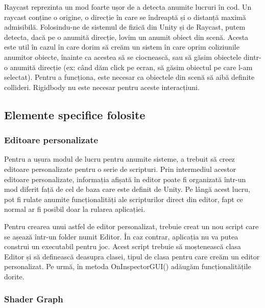 \documentclass[12pt, a4paper]{article}
\begin{document}
	Raycast reprezinta un mod foarte ușor de a detecta anumite lucruri în cod. Un raycast conține o origine, o direcție în care se îndreaptă și o distanță maximă admisibilă. Folosindu-ne de sistemul de fizică din Unity și de Raycast, putem detecta, dacă pe o anumită direcție, lovim un anumit obiect din scenă. Acesta este util în cazul în care dorim să creăm un sistem în care oprim coliziunile anumitor obiecte, înainte ca acestea să se ciocnească, sau să găsim obiectele dintr-o anumită direcție (ex: când dăm click pe ecran, să găsim obiectul pe care l-am selectat). Pentru a funcționa, este necesar ca obiectele din scenă să aibă definite collideri. Rigidbody nu este necesar pentru aceste interacțiuni.
	
	
	
	
	\subsection{Elemente specifice folosite}
	\label{section: specificElements}	
	
	\subsubsection{Editoare personalizate}
	
	Pentru a ușura modul de lucru pentru anumite sisteme, a trebuit să creez editoare personalizate pentru o serie de scripturi. Prin intermediul acestor editoare personalizate, informația afișată în editor poate fi organizată într-un mod diferit față de cel de baza care este definit de Unity. Pe lângă acest lucru, pot fi rulate anumite funcționalități ale scripturilor direct din editor, fapt ce normal ar fi posibil doar la rularea aplicației.
	\newline
	
	Pentru crearea unui astfel de editor personalizat, trebuie creat un nou script care se așează într-un folder numit Editor. În caz contrar, aplicația nu va putea construi un executabil pentru joc. Acest script trebuie să moștenească clasa Editor și să definească deasupra clasei, tipul de clasa pentru care creăm un editor personalizat. Pe urmă, în metoda OnInspectorGUI() adăugăm funcționalitățile dorite.
	
	
	
	
	
	\subsubsection{Shader Graph}
	
\end{document}
